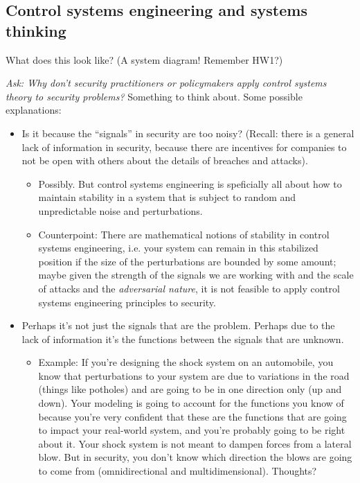 \documentclass[11pt]{article}
\begin{document}
\subsection{Control systems engineering and systems thinking}

What does this look like? (A system diagram! Remember HW1?)

{\it Ask: Why don't security practitioners or policymakers apply control systems theory to security problems?} Something to think about. Some possible explanations:
\begin{itemize}
    \item Is it because the ``signals'' in security are too noisy? (Recall: there is a general lack of information in security, because there are incentives for companies to not be open with others about the details of breaches and attacks).
    \begin{itemize}
        \item Possibly. But control systems engineering is speficially all about how to maintain stability in a system that is subject to random and unpredictable noise and perturbations.
        \item Counterpoint: There are mathematical notions of stability in control systems engineering, i.e. your system can remain in this stabilized position if the size of the perturbations are bounded by some amount; maybe given the strength of the signals we are working with and the scale of attacks and the {\it adversarial nature}, it is not feasible to apply control systems engineering principles to security. 
    \end{itemize}
    \item Perhaps it's not just the signals that are the problem. Perhaps due to the lack of information it's the functions between the signals that are unknown.
    \begin{itemize}
        \item Example: If you're designing the shock system on an automobile, you know that perturbations to your system are due to variations in the road (things like potholes) and are going to be in one direction only (up and down). Your modeling is going to account for the functions you know of because you're very confident that these are the functions that are going to impact your real-world system, and you're probably going to be right about it.  Your shock system is not meant to dampen forces from a lateral blow. But in security, you don't know which direction the blows are going to come from (omnidirectional and multidimensional). Thoughts? 
    \end{itemize}
\end{itemize}
\end{document}
